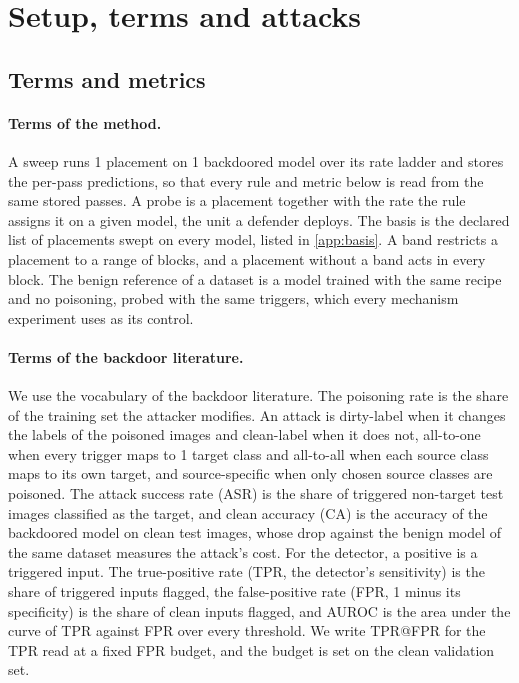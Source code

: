 
\section{Setup, terms and attacks}
\label{app:setup}

\subsection{Terms and metrics}
\label{app:glossary}

\paragraph{Terms of the method.}
A sweep runs 1 placement on 1 backdoored model over its rate ladder and stores the per-pass predictions, so that every rule and metric below is read from the same stored passes. A probe is a placement together with the rate the rule assigns it on a given model, the unit a defender deploys. The basis is the declared list of placements swept on every model, listed in \cref{app:basis}. A band restricts a placement to a range of blocks, and a placement without a band acts in every block. The benign reference of a dataset is a model trained with the same recipe and no poisoning, probed with the same triggers, which every mechanism experiment uses as its control.

\paragraph{Terms of the backdoor literature.}
We use the vocabulary of the backdoor literature. The poisoning rate is the share of the training set the attacker modifies. An attack is dirty-label when it changes the labels of the poisoned images and clean-label when it does not, all-to-one when every trigger maps to 1 target class and all-to-all when each source class maps to its own target, and source-specific when only chosen source classes are poisoned. The attack success rate (ASR) is the share of triggered non-target test images classified as the target, and clean accuracy (CA) is the accuracy of the backdoored model on clean test images, whose drop against the benign model of the same dataset measures the attack's cost. For the detector, a positive is a triggered input. The true-positive rate (TPR, the detector's sensitivity) is the share of triggered inputs flagged, the false-positive rate (FPR, 1 minus its specificity) is the share of clean inputs flagged, and AUROC is the area under the curve of TPR against FPR over every threshold. We write TPR@FPR for the TPR read at a fixed FPR budget, and the budget is set on the clean validation set.



